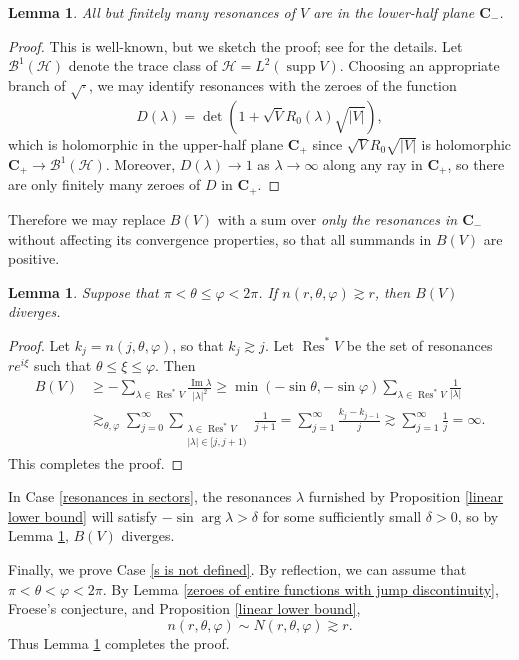 \documentclass[reqno,12pt,letterpaper]{amsart}
\newcommand{\CC}{\mathbf{C}}
\DeclareMathOperator{\Res}{Res}
\DeclareMathOperator{\supp}{supp}
\renewcommand{\Im}{\operatorname{Im}}
\newtheorem{lemma}[theorem]{Lemma}
\theoremstyle{definition}
\begin{document}
\begin{lemma}
All but finitely many resonances of $V$ are in the lower-half plane $\CC_-$.
\end{lemma}
\begin{proof}
This is well-known, but we sketch the proof; see \cite[\S3]{froese1997asymptotic} for the details.
Let $\mathcal B^1(\mathcal H)$ denote the trace class of $\mathcal H = L^2(\supp V)$. Choosing an appropriate branch of $\sqrt\cdot$, we may identify resonances with the zeroes of the function
$$D(\lambda) = \det(1 + \sqrt V R_0(\lambda) \sqrt{|V|}),$$
which is holomorphic in the upper-half plane $\CC_+$ since $\sqrt V R_0 \sqrt{|V|}$ is holomorphic $\CC_+ \to \mathcal B^1(\mathcal H)$. Moreover, $D(\lambda) \to 1$ as $\lambda \to \infty$ along any ray in $\CC_+$,
so there are only finitely many zeroes of $D$ in $\CC_+$.
\end{proof}
Therefore we may replace $B(V)$ with a sum over \emph{only the resonances in $\CC_-$} without affecting its convergence properties, so that all summands in $B(V)$ are positive.

\begin{lemma}
\label{divergence of angular series}
Suppose that $\pi < \theta \leq \varphi < 2\pi$. If $n(r, \theta, \varphi) \gtrsim r$, then $B(V)$ diverges.
\end{lemma}
\begin{proof}
Let $k_j = n(j, \theta, \varphi)$, so that $k_j \gtrsim j$.
Let $\Res^* V$ be the set of resonances $re^{i\xi}$ such that $\theta \leq \xi \leq \varphi$. Then
\begin{align*}
B(V) &\geq -\sum_{\lambda \in \Res^* V} \frac{\Im \lambda}{|\lambda|^2}  \geq \min(-\sin \theta, -\sin \varphi) \sum_{\lambda \in \Res^* V} \frac{1}{|\lambda|}\\%
  & \gtrsim_{\theta,\varphi} \sum_{j=0}^\infty \sum_{\substack{\lambda \in \Res^* V\\|\lambda| \in [j, j+1)}} \frac{1}{j+1}
  = \sum_{j=1}^\infty \frac{k_j - k_{j-1}}{j} \gtrsim \sum_{j=1}^\infty \frac{1}{j} = \infty.
\end{align*}
This completes the proof.
\end{proof}

In Case \ref{resonances in sectors},
the resonances $\lambda$ furnished by Proposition \ref{linear lower bound} will satisfy $-\sin \arg \lambda > \delta$ for some sufficiently small $\delta > 0$,
so by Lemma \ref{divergence of angular series}, $B(V)$ diverges.

Finally, we prove Case \ref{s is not defined}. By reflection, we can assume that $\pi < \theta < \varphi < 2\pi$.
By Lemma \ref{zeroes of entire functions with jump discontinuity}, Froese's conjecture, and Proposition \ref{linear lower bound},
$$n(r, \theta, \varphi) \sim N(r, \theta, \varphi) \gtrsim r.$$
Thus Lemma \ref{divergence of angular series} completes the proof.

\printbibliography
\end{document}
